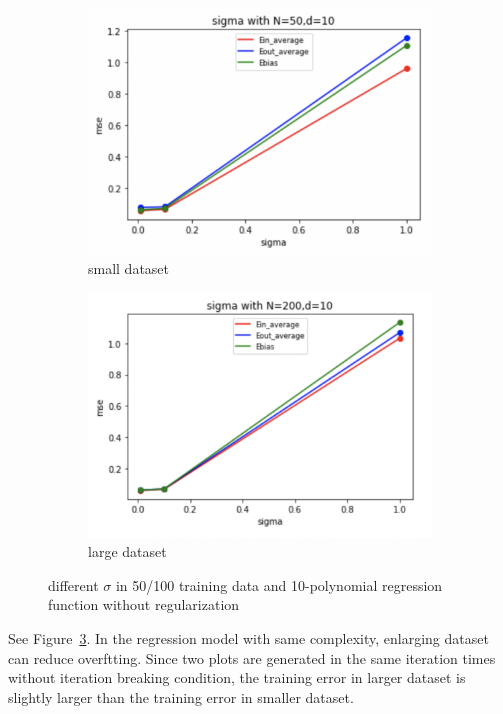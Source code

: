 \documentclass[12pt,letterpaper]{article}
\begin{document}
\begin{figure}[h]
\centering
\begin{subfigure}{.45\textwidth}
  \centering
  \includegraphics[width=.9\linewidth]{lzn50d10.png}
  \caption{\small small dataset}
  \label{fig:sub1}
\end{subfigure}
\begin{subfigure}{.45\textwidth}
  \centering
  \includegraphics[width=.9\linewidth]{lzn200d10.png}
  \caption{\small large dataset}
  \label{fig:sub2}
\end{subfigure}
\caption{\small different $\sigma$ in 50/100 training data and 10-polynomial regression function without regularization}
\label{fig:n50/200d10}
\end{figure}

See Figure~\ref{fig:n50/200d10}. In the regression model with same complexity, enlarging dataset can reduce overftting. Since two plots are generated in the same iteration times without iteration breaking condition, the training error in larger dataset is slightly larger than the training error in smaller dataset. 
\end{document}

